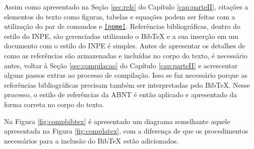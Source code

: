 Assim como apresentado na Seção \ref{sec:refs} do Capítulo \ref{cap:parteII}, citações a elementos do texto como figuras, tabelas e equações podem ser feitas com a utilização do par de comandos \texttt{\label{nome}} e \texttt{\ref{nome}}. Referências bibliográficas, dentro do estilo do INPE, são gerenciadas utilizando o Bib\TeX{} e a sua inserção em um documento com o estilo do INPE é simples. Antes de apresentar os detalhes de como as referências são armazenadas e incluídas no corpo do texto, é necessário antes, voltar à Seção \ref{sec:compilacao} do Capítulo \ref{cap:parteII} e acrescentar alguns passos extras ao processo de compilação. Isso se faz necessário porque as referências bibliográficas precisam também ser interpretadas pelo Bib\TeX{}. Nesse processo, o estilo de referências da ABNT é então aplicado e apresentado da forma correta no corpo do texto.

Na Figura \ref{fig:compbibtex} é apresentado um diagrama semelhante aquele apresentada na Figura \ref{fig:complatex}, com a diferença de que os procedimentos necessários para a inclusão do Bib\TeX{} estão adicionados.

